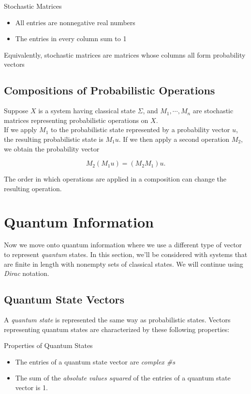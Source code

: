 \documentclass[svgnames]{article}     %
\begin{document}
\begin{mainbox}{Stochastic Matrices}
  \begin{itemize}
    \item[1.] All entries are nonnegative real numbers
    \item[2.] The entries in every column sum to 1
  \end{itemize}
\end{mainbox}

Equivalently, stochastic matrices are matrices whose columns all form
probability vectors

\subsection{Compositions of Probabilistic Operations}

Suppose $X$ is a system having classical state $\Sigma$, and $M_1, \cdots, M_n$
are stochastic matrices representing probabilistic operations on $X$. \\

If we apply $M_1$ to the probabilistic state represented by a probability
vector $u$, the resulting probabilistic state is $M_1 u.$ If we then apply
a second operation $M_2$, we obtain the probability vector

\[
M_2(M_1 u) = (M_2M_1)u. 
\] \vspace{5px}

The order in which operations are applied in a composition can change the
resulting operation. 

\section{Quantum Information}

Now we move onto quantum information where we use a different type of vector to
represent  \textit{quantum} states. In this section, we'll be considered with
systems that are finite in length with nonempty sets of classical states. We
will continue using \textit{Dirac} notation. 

\subsection{Quantum State Vectors} 

A \textit{quantum state} is represented the same way as probabilistic states.
Vectors representing quantum states are characterized by these following
properties: 

\begin{subbox}{Properties of Quantum States}
  \begin{itemize}
    \item[1.] The entries of a quantum state vector are \textit{complex \#s}
    \item[2.] The sum of the \textit{absolute values squared}  of the entries
      of a quantum state vector is 1. 
  \end{itemize}
\end{subbox}
\end{document}
